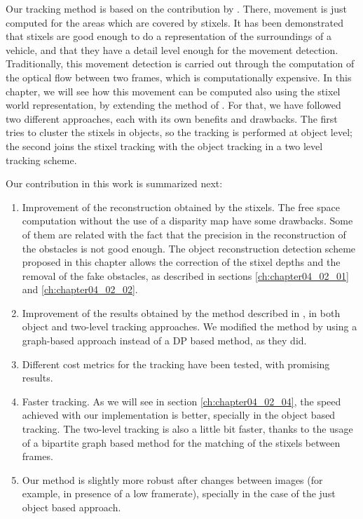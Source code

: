 Our tracking method is based on the contribution by \cite{gunyel2012stixels}. There, movement is just computed for the areas which are covered by stixels. It has been demonstrated that stixels are good enough to do a representation of the surroundings of a vehicle, and that they have a detail level enough for the movement detection. Traditionally, this movement detection is carried out through the computation of the optical flow between two frames, which is computationally expensive. In this chapter, we will see how this movement can be computed also using the stixel world representation, by extending the method of \cite{gunyel2012stixels}. For that, we have followed two different approaches, each with its own benefits and drawbacks. The first tries to cluster the stixels in objects, so the tracking is performed at object level; the second joins the stixel tracking with the object tracking in a two level tracking scheme.

Our contribution in this work is summarized next:
\begin{enumerate}
 \item Improvement of the reconstruction obtained by the stixels. The free space computation without the use of a disparity map have some drawbacks. Some of them are related with the fact that the precision in the reconstruction of the obstacles is not good enough. The object reconstruction detection scheme proposed in this chapter allows the correction of the stixel depths and the removal of the fake obstacles, as described in sections \ref{ch:chapter04_02_01} and \ref{ch:chapter04_02_02}.
 \item Improvement of the results obtained by the method described in \cite{gunyel2012stixels}, in both object and two-level tracking approaches. We modified the method by using a graph-based approach instead of a \ac{DP} based method, as they did. 
 \item Different cost metrics for the tracking have been tested, with promising results. 
 \item Faster tracking. As we will see in section \ref{ch:chapter04_02_04}, the speed achieved with our implementation is better, specially in the object based tracking. The two-level tracking is also a little bit faster, thanks to the usage of a bipartite graph based method for the matching of the stixels between frames.
 \item Our method is slightly more robust after changes between images (for example, in presence of a low framerate), specially in the case of the just object based approach.
\end{enumerate}

